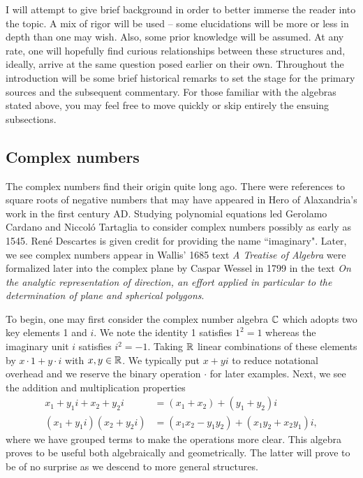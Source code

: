 \documentclass[12pt]{article}
\begin{document}
I will attempt to give brief background in order to better immerse the reader into the topic. A mix of rigor will be used -- some elucidations will be more or less in depth than one may wish. Also, some prior knowledge will be assumed. At any rate, one will hopefully find curious relationships between these structures and, ideally, arrive at the same question posed earlier on their own. Throughout the introduction will be some brief historical remarks to set the stage for the primary sources and the subsequent commentary. For those familiar with the algebras stated above, you may feel free to move quickly or skip entirely the ensuing subsections. 

\subsection{Complex numbers}
The complex numbers find their origin quite long ago. There were references to square roots of negative numbers that may have appeared in Hero of Alaxandria's work in the first century AD. Studying polynomial equations led Gerolamo Cardano and Niccol\'o Tartaglia to consider complex numbers possibly as early as 1545. Ren\'e Descartes is given credit for providing the name ``imaginary". Later, we see complex numbers appear in Wallis' 1685 text \emph{A Treatise of Algebra} were formalized later into the complex plane by Caspar Wessel in 1799 in the text \emph{On the analytic representation of direction, an effort applied in particular to the determination of plane and spherical polygons}. 

To begin, one may first consider the complex number algebra $\mathbb{C}$ which adopts two key elements 1 and $i$. We note the identity 1 satisfies  $1^2=1$ whereas the imaginary unit $i$ satisfies $i^2=-1$. Taking $\mathbb{R}$ linear combinations of these elements by $x\cdot 1 + y \cdot i$ with $x,y \in \mathbb{R}$. We typically put $x+yi$ to reduce notational overhead and we reserve the binary operation $\cdot$ for later examples. Next, we see the addition and multiplication properties
\begin{align}
\label{eq:C_addition}
    x_1 + y_1 i + x_2 + y_2i  &= (x_1+x_2)+(y_1+y_2)i\\
\label{eq:C_multiplication}
    (x_1 + y_1 i)(x_2 + y_2i) &= (x_1x_2-y_1y_2)+(x_1y_2+x_2y_1)i,
\end{align}
where we have grouped terms to make the operations more clear. This algebra proves to be useful both algebraically and geometrically. The latter will prove to be of no surprise as we descend to more general structures.
\end{document}
